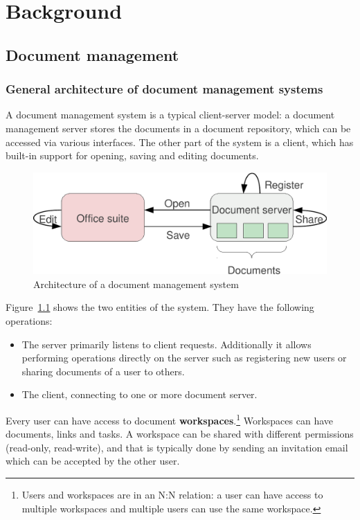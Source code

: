\chapter{Background}

\section{Document management}

\subsection{General architecture of document management systems}

A document management system is a typical client-server model: a document
management server stores the documents in a document repository, which can be
accessed via various interfaces.  The other part of the system is a client,
which has built-in support for opening, saving and editing documents.

\begin{figure}[H]
\centering
\includegraphics[width=450px,keepaspectratio]{general-arch-of-doc-mgmt-systems.pdf}
\caption{Architecture of a document management system}
\label{fig:general-arch-of-doc-mgmt-systems}
\end{figure}

Figure~\ref{fig:general-arch-of-doc-mgmt-systems} shows the two entities of the
system. They have the following operations:

\begin{itemize}
\item The server primarily listens to client requests. Additionally it allows
performing operations directly on the server such as registering new users or
sharing documents of a user to others.
\item The client, connecting to one or more document server.
\end{itemize}

Every user can have access to document \textbf{workspaces}.\footnote{Users and workspaces are in an N:N relation: a user can have access to multiple workspaces and multiple users can use the same workspace.} Workspaces can have documents,
links and tasks. A workspace can be shared with different permissions
(read-only, read-write), and that is typically done by sending an invitation
email which can be accepted by the other user.

